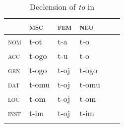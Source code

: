 \begin{table}
\caption{Declension of \textit{to} in }
\label{to:Rus-decl}
\begin{tabular}[t]{ l l l l l l }
\lsptoprule	
& \textsc{msc} & \textsc{fem} & \textsc{neu}\\\hline
  \textsc{nom} & t-ot & t-a & t-o\cellcolor[gray]{0.9}\\
  \textsc{acc}  & t-ogo & t-u & t-o\cellcolor[gray]{0.9}\\
  \textsc{gen} & t-ogo & t-oj & t-ogo\\
  \textsc{dat}  & t-omu & t-oj & t-omu\\
  \textsc{loc} & t-om & t-oj & t-om\\
  \textsc{inst} & t-im & t-oj & t-im\\
  \lspbottomrule
\end{tabular}
\end{table}



